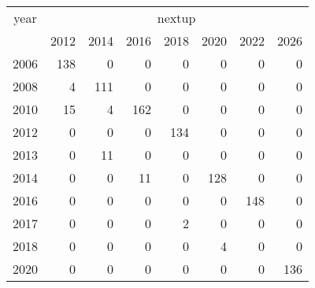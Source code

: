 \footnotesize\begin{tabular}[t]{lrrrrrrr}
\toprule
\multicolumn{1}{c}{year} & \multicolumn{7}{c}{nextup} \\
\cmidrule(l{3pt}r{3pt}){1-1} \cmidrule(l{3pt}r{3pt}){2-8}
  & 2012 & 2014 & 2016 & 2018 & 2020 & 2022 & 2026\\
\midrule
2006 & 138 & 0 & 0 & 0 & 0 & 0 & 0\\
2008 & 4 & 111 & 0 & 0 & 0 & 0 & 0\\
2010 & 15 & 4 & 162 & 0 & 0 & 0 & 0\\
2012 & 0 & 0 & 0 & 134 & 0 & 0 & 0\\
2013 & 0 & 11 & 0 & 0 & 0 & 0 & 0\\
2014 & 0 & 0 & 11 & 0 & 128 & 0 & 0\\
2016 & 0 & 0 & 0 & 0 & 0 & 148 & 0\\
2017 & 0 & 0 & 0 & 2 & 0 & 0 & 0\\
2018 & 0 & 0 & 0 & 0 & 4 & 0 & 0\\
2020 & 0 & 0 & 0 & 0 & 0 & 0 & 136\\
\bottomrule
\end{tabular}
